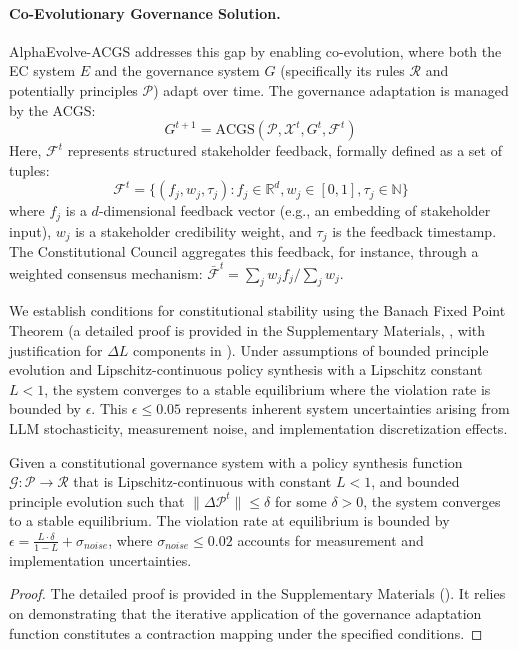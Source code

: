 \documentclass[manuscript,screen,9pt]{acmart}
\begin{document}
\paragraph{Co-Evolutionary Governance Solution.} AlphaEvolve-ACGS addresses this gap by enabling co-evolution, where both the EC system $E$ and the governance system $G$ (specifically its rules $\mathcal{R}$ and potentially principles $\mathcal{P}$) adapt over time. The governance adaptation is managed by the ACGS:
\[G^{t+1} = \text{ACGS}(\mathcal{P}, \mathcal{X}^t, G^t, \mathcal{F}^t)\]
Here, $\mathcal{F}^t$ represents structured stakeholder feedback, formally defined as a set of tuples:
\[\mathcal{F}^t = \{(f_j, w_j, \tau_j) : f_j \in \mathbb{R}^d, w_j \in [0,1], \tau_j \in \mathbb{N}\}\]
where $f_j$ is a $d$-dimensional feedback vector (e.g., an embedding of stakeholder input), $w_j$ is a stakeholder credibility weight, and $\tau_j$ is the feedback timestamp. The Constitutional Council aggregates this feedback, for instance, through a weighted consensus mechanism: $\bar{\mathcal{F}}^t = \sum_{j} w_j f_j / \sum_{j} w_j$.

We establish conditions for constitutional stability using the Banach Fixed Point Theorem (a detailed proof is provided in the Supplementary Materials, , with justification for $\Delta L$ components in ). Under assumptions of bounded principle evolution and Lipschitz-continuous policy synthesis with a Lipschitz constant $L < 1$, the system converges to a stable equilibrium where the violation rate is bounded by $\epsilon$. This $\epsilon \leq 0.05$ represents inherent system uncertainties arising from LLM stochasticity, measurement noise, and implementation discretization effects.

\begin{theorem}
\label{thm:constitutional_stability}
Given a constitutional governance system with a policy synthesis function $\mathcal{G}: \mathcal{P} \rightarrow \mathcal{R}$ that is Lipschitz-continuous with constant $L < 1$, and bounded principle evolution such that $\|\Delta \mathcal{P}^t\| \leq \delta$ for some $\delta > 0$, the system converges to a stable equilibrium. The violation rate at equilibrium is bounded by $\epsilon = \frac{L \cdot \delta}{1-L} + \sigma_{noise}$, where $\sigma_{noise} \leq 0.02$ accounts for measurement and implementation uncertainties.
\end{theorem}
\begin{proof}
The detailed proof is provided in the Supplementary Materials (). It relies on demonstrating that the iterative application of the governance adaptation function constitutes a contraction mapping under the specified conditions.
\end{proof}
\end{document}

